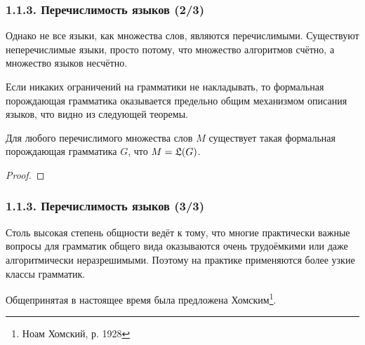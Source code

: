\begin{frame}
\frametitle{1.1.3. Перечислимость языков (2/3)}
\medskip
Однако не все языки, как множества слов,
являются перечислимыми.
Существуют неперечислимые языки, просто потому,
что множество алгоритмов счётно, а множество языков несчётно.

\medskip
Если никаких ограничений на грамматики не накладывать, то
формальная порождающая грамматика оказывается предельно общим
механизмом описания языков, что видно из следующей теоремы.
\begin{theorem}
Для любого перечислимого множества слов $M$ существует такая
формальная порождающая грамматика $G$, что $M=\frak{L}(G)$.
\end{theorem}
\begin{proof}

\medskip
{}
\end{proof}
\end{frame}

\begin{frame}
\frametitle{1.1.3. Перечислимость языков (3/3)}
\medskip
Столь высокая степень общности ведёт к тому, что многие
практически важные вопросы для грамматик общего вида оказываются
очень трудоёмкими или даже алгоритмически неразрешимыми. Поэтому
на практике применяются более узкие классы грамматик. 

\medskip
Общепринятая в настоящее время
 была
предложена Хомским\footnote{Ноам Хомский, р. 1928}.
\end{frame}


